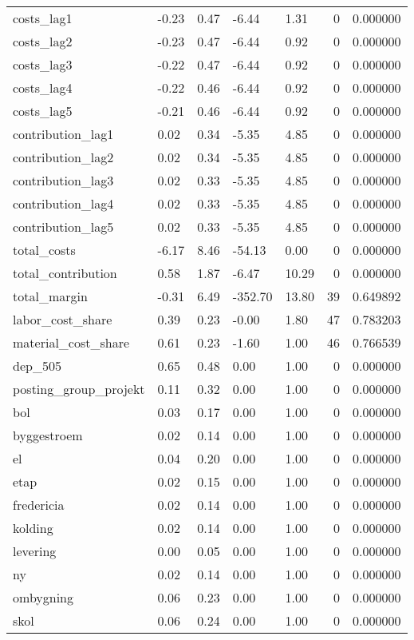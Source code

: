 \begin{landscape}
\begin{longtable}[h!]{lllllrr}
costs_lag1 & -0.23 & 0.47 & -6.44 & 1.31 & 0 & 0.000000 \\
costs_lag2 & -0.23 & 0.47 & -6.44 & 0.92 & 0 & 0.000000 \\
costs_lag3 & -0.22 & 0.47 & -6.44 & 0.92 & 0 & 0.000000 \\
costs_lag4 & -0.22 & 0.46 & -6.44 & 0.92 & 0 & 0.000000 \\
costs_lag5 & -0.21 & 0.46 & -6.44 & 0.92 & 0 & 0.000000 \\
contribution_lag1 & 0.02 & 0.34 & -5.35 & 4.85 & 0 & 0.000000 \\
contribution_lag2 & 0.02 & 0.34 & -5.35 & 4.85 & 0 & 0.000000 \\
contribution_lag3 & 0.02 & 0.33 & -5.35 & 4.85 & 0 & 0.000000 \\
contribution_lag4 & 0.02 & 0.33 & -5.35 & 4.85 & 0 & 0.000000 \\
contribution_lag5 & 0.02 & 0.33 & -5.35 & 4.85 & 0 & 0.000000 \\
total_costs & -6.17 & 8.46 & -54.13 & 0.00 & 0 & 0.000000 \\
total_contribution & 0.58 & 1.87 & -6.47 & 10.29 & 0 & 0.000000 \\
total_margin & -0.31 & 6.49 & -352.70 & 13.80 & 39 & 0.649892 \\
labor_cost_share & 0.39 & 0.23 & -0.00 & 1.80 & 47 & 0.783203 \\
material_cost_share & 0.61 & 0.23 & -1.60 & 1.00 & 46 & 0.766539 \\
dep_505 & 0.65 & 0.48 & 0.00 & 1.00 & 0 & 0.000000 \\
posting_group_projekt & 0.11 & 0.32 & 0.00 & 1.00 & 0 & 0.000000 \\
bol & 0.03 & 0.17 & 0.00 & 1.00 & 0 & 0.000000 \\
byggestroem & 0.02 & 0.14 & 0.00 & 1.00 & 0 & 0.000000 \\
el & 0.04 & 0.20 & 0.00 & 1.00 & 0 & 0.000000 \\
etap & 0.02 & 0.15 & 0.00 & 1.00 & 0 & 0.000000 \\
fredericia & 0.02 & 0.14 & 0.00 & 1.00 & 0 & 0.000000 \\
kolding & 0.02 & 0.14 & 0.00 & 1.00 & 0 & 0.000000 \\
levering & 0.00 & 0.05 & 0.00 & 1.00 & 0 & 0.000000 \\
ny & 0.02 & 0.14 & 0.00 & 1.00 & 0 & 0.000000 \\
ombygning & 0.06 & 0.23 & 0.00 & 1.00 & 0 & 0.000000 \\
skol & 0.06 & 0.24 & 0.00 & 1.00 & 0 & 0.000000 \\

\end{longtable}
\end{landscape}

